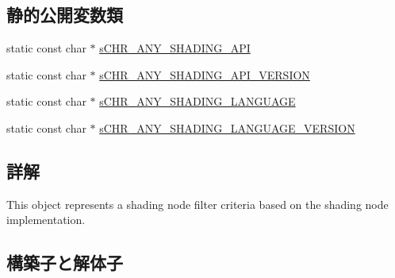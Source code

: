 \subsection*{静的公開変数類}
\begin{DoxyCompactItemize}
\item 
static const char $\ast$ \hyperlink{class_fbx_implementation_filter_a596d1d4050df2c9a608520ee6dd6bdfd}{s\+C\+H\+R\+\_\+\+A\+N\+Y\+\_\+\+S\+H\+A\+D\+I\+N\+G\+\_\+\+A\+PI}
\item 
static const char $\ast$ \hyperlink{class_fbx_implementation_filter_ac81682276ccaaf912fa5795b1b90110d}{s\+C\+H\+R\+\_\+\+A\+N\+Y\+\_\+\+S\+H\+A\+D\+I\+N\+G\+\_\+\+A\+P\+I\+\_\+\+V\+E\+R\+S\+I\+ON}
\item 
static const char $\ast$ \hyperlink{class_fbx_implementation_filter_a682a04bbd0db2b4ff00e13cecb27badc}{s\+C\+H\+R\+\_\+\+A\+N\+Y\+\_\+\+S\+H\+A\+D\+I\+N\+G\+\_\+\+L\+A\+N\+G\+U\+A\+GE}
\item 
static const char $\ast$ \hyperlink{class_fbx_implementation_filter_af479f36e72bb5dd80c400edbab0ceafe}{s\+C\+H\+R\+\_\+\+A\+N\+Y\+\_\+\+S\+H\+A\+D\+I\+N\+G\+\_\+\+L\+A\+N\+G\+U\+A\+G\+E\+\_\+\+V\+E\+R\+S\+I\+ON}
\end{DoxyCompactItemize}


\subsection{詳解}
This object represents a shading node filter criteria based on the shading node implementation. 

\subsection{構築子と解体子}
\mbox{\label{class_fbx_implementation_filter_ab53b0ef25ada946751aaa8df6490809b}} 
